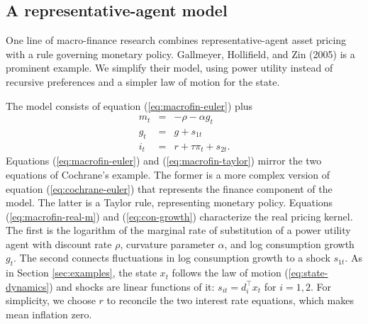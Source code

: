 \documentclass[11pt]{article}
\begin{document}
{\subsection{A representative-agent model}
\label{sec:rep-agent}

One line of macro-finance research combines representative-agent
asset pricing with a rule governing monetary policy.
Gallmeyer, Hollifield, and Zin (2005) is a prominent example.
We simplify their model,
using power utility instead of recursive preferences and
a simpler law of motion for the state.

The model consists of equation (\ref{eq:macrofin-euler}) plus
\begin{eqnarray}
    m_t &=& - \rho - \alpha g_t \label{eq:macrofin-real-m} \\
    g_t &=& g + s_{1t}   \label{eq:con-growth} \\
    i_t &=& r + \tau \pi_t + s_{2t} .
        \label{eq:macrofin-taylor}
\end{eqnarray}
Equations (\ref{eq:macrofin-euler}) and (\ref{eq:macrofin-taylor}) mirror
the two equations of Cochrane's example.
The former is
a more complex version of equation (\ref{eq:cochrane-euler})
that represents the finance component of the model.
The latter is a Taylor rule, representing monetary policy.
Equations (\ref{eq:macrofin-real-m}) and (\ref{eq:con-growth}) characterize the real pricing kernel.
The first is the logarithm of the marginal rate of substitution
of a power utility agent with discount rate $\rho$,
curvature parameter $\alpha$,
and log consumption growth $g_t$.
The second connects fluctuations in log consumption growth to a shock $s_{1t}$.
As in Section \ref{sec:examples}, the state $x_t$ follows the law of motion (\ref{eq:state-dynamics})
and shocks are linear functions of it: $s_{it} = d_i^\top x_t $ for $i=1,2$.
For simplicity, we choose $r$ to reconcile the two interest rate equations,
which makes mean inflation zero.

}
\end{document}
